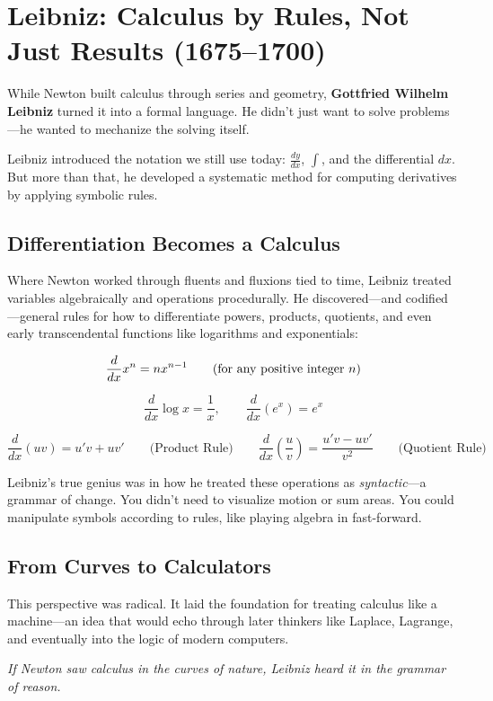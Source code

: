 \section{Leibniz: Calculus by Rules, Not Just Results (1675–1700)}

While Newton built calculus through series and geometry, \textbf{Gottfried Wilhelm Leibniz} turned it into a formal language.  
He didn’t just want to solve problems—he wanted to mechanize the solving itself.

Leibniz introduced the notation we still use today: \( \frac{dy}{dx} \), \( \int \), and the differential \( dx \).  
But more than that, he developed a systematic method for computing derivatives by applying symbolic rules.

\subsection{Differentiation Becomes a Calculus}

Where Newton worked through fluents and fluxions tied to time, Leibniz treated variables algebraically and operations procedurally.  
He discovered—and codified—general rules for how to differentiate powers, products, quotients, and even early transcendental functions like logarithms and exponentials:

\[
\frac{d}{dx} x^n = n x^{n-1} \qquad \text{(for any positive integer \( n \))}
\]

\[
\frac{d}{dx} \log x = \frac{1}{x}, \qquad \frac{d}{dx} (e^x) = e^x
\]

\[
\frac{d}{dx}(uv) = u'v + uv' \qquad \text{(Product Rule)}
\quad\quad
\frac{d}{dx} \left( \frac{u}{v} \right) = \frac{u'v - uv'}{v^2} \qquad \text{(Quotient Rule)}
\]

Leibniz’s true genius was in how he treated these operations as \textit{syntactic}—a grammar of change.  
You didn’t need to visualize motion or sum areas. You could manipulate symbols according to rules, like playing algebra in fast-forward.

\subsection{From Curves to Calculators}

This perspective was radical. It laid the foundation for treating calculus like a machine—an idea that would echo through later thinkers like Laplace, Lagrange, and eventually into the logic of modern computers.

\vspace{1em}

\begin{center}
\textit{If Newton saw calculus in the curves of nature, Leibniz heard it in the grammar of reason.}
\end{center}
